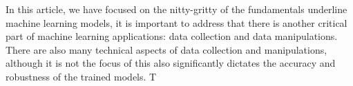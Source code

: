 In this article, we have focused on the nitty-gritty of the fundamentals underline machine learning models, it is important to address that there is another critical part of machine learning applications: data collection and data manipulations. There are also many technical aspects of data collection and manipulations, although it is not the focus of this  also significantly dictates the accuracy and robustness of the trained models. T